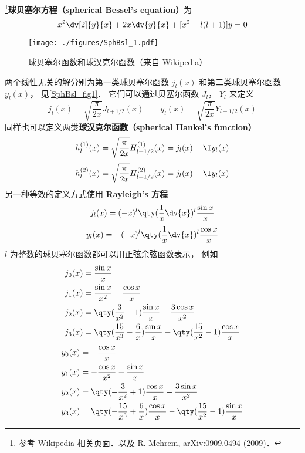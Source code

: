 

\footnote{参考 Wikipedia \href{https://en.wikipedia.org/wiki/Bessel_function}{相关页面}．以及 R. Mehrem, \href{https://arxiv.org/abs/0909.0494}{arXiv:0909.0494} (2009)．}\textbf{球贝塞尔方程（spherical Bessel's equation）}为
\begin{equation}
x^2 \dv[2]{y}{x} + 2x \dv{y}{x} + [x^2 - l(l + 1)]y = 0
\end{equation}
\begin{figure}[ht]
\centering
\texttt{[image: ./figures/SphBsl\_1.pdf]}
\caption{球贝塞尔函数和球汉克尔函数（来自 Wikipedia）} \label{SphBsl_fig1}
\end{figure}
两个线性无关的解分别为第一类球贝塞尔函数 $j_l(x)$ 和第二类球贝塞尔函数 $y_l(x)$， 见\autoref{SphBsl_fig1}． 它们可以通过贝塞尔函数 $J_l$， $Y_l$ 来定义
\begin{equation}
j_l(x) = \sqrt{\frac{\pi}{2x}} J_{l+1/2}(x)
\qquad
y_l(x) = \sqrt{\frac{\pi}{2x}} Y_{l+1/2}(x)
\end{equation}
同样也可以定义两类\textbf{球汉克尔函数（spherical Hankel's function）}
\begin{equation}
h_l^{(1)}(x) = \sqrt {\frac{\pi }{2x}} H_{l+1/2}^{(1)}(x) = j_l(x) + \I y_l(x)
\end{equation}
\begin{equation}
h_l^{(2)}(x) = \sqrt{\frac{\pi }{2x}} H_{l+1/2}^{(2)}(x) = j_l(x) - \I y_l(x)
\end{equation}
另一种等效的定义方式使用 \textbf{Rayleigh's 方程}
\begin{equation}
j_l(x) = (-x)^l \qty(\frac{1}{x} \dv{x})^l \frac{\sin x}{x}
\end{equation}
\begin{equation}
y_l(x) = -(-x)^l \qty(\frac{1}{x} \dv{x})^l \frac{\cos x}{x}
\end{equation}
$l$ 为整数的球贝塞尔函数都可以用正弦余弦函数表示， 例如
\begin{align}
&j_0(x) = \frac{\sin x}{x}\\
&j_1(x) = \frac{\sin x}{x^2} - \frac{\cos x}{x}\\
&j_2(x) = \qty(\frac{3}{x^2} - 1) \frac{\sin x}{x} - \frac{3\cos x}{x^2}\\
&j_3(x) = \qty(\frac{15}{x^3} - \frac{6}{x})\frac{\sin x}{x} - \qty(\frac{15}{x^2}-1)\frac{\cos x}{x}
\end{align}
\begin{align}
&y_0(x) = -\frac{\cos x}{x}\\
&y_1(x) = -\frac{\cos x}{x^2} - \frac{\sin x}{x}\\
&y_2(x) = \qty(-\frac{3}{x^2}+1)\frac{\cos x}{x} - \frac{3\sin x}{x^2}\\
&y_3(x) = \qty(-\frac{15}{x^3}+\frac{6}{x}) \frac{\cos x}{x} - \qty(\frac{15}{x^2} - 1)\frac{\sin x}{x}
\end{align}
